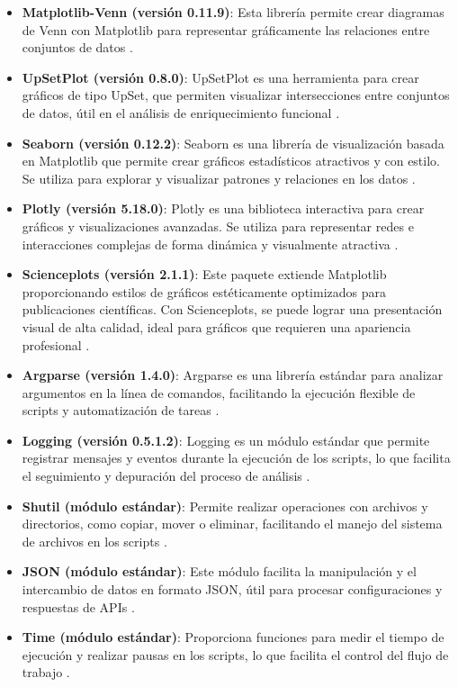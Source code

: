 \begin{itemize}
	\item \textbf{Matplotlib-Venn (versión 0.11.9)}: Esta librería permite crear diagramas de Venn con Matplotlib para representar gráficamente las relaciones entre conjuntos de datos \cite{matplotlibvenn}.
	\item \textbf{UpSetPlot (versión 0.8.0)}: UpSetPlot es una herramienta para crear gráficos de tipo UpSet, que permiten visualizar intersecciones entre conjuntos de datos, útil en el análisis de enriquecimiento funcional \cite{upsetplot}.
	\item \textbf{Seaborn (versión 0.12.2)}: Seaborn es una librería de visualización basada en Matplotlib que permite crear gráficos estadísticos atractivos y con estilo. Se utiliza para explorar y visualizar patrones y relaciones en los datos \cite{seaborn}.
	\item \textbf{Plotly (versión 5.18.0)}: Plotly es una biblioteca interactiva para crear gráficos y visualizaciones avanzadas. Se utiliza para representar redes e interacciones complejas de forma dinámica y visualmente atractiva \cite{plotly}.
	\item \textbf{Scienceplots (versión 2.1.1)}: Este paquete extiende Matplotlib proporcionando estilos de gráficos estéticamente optimizados para publicaciones científicas. Con Scienceplots, se puede lograr una presentación visual de alta calidad, ideal para gráficos que requieren una apariencia profesional \cite{scienceplots}.
	\item \textbf{Argparse (versión 1.4.0)}: Argparse es una librería estándar para analizar argumentos en la línea de comandos, facilitando la ejecución flexible de scripts y automatización de tareas \cite{argparse}.
	\item \textbf{Logging (versión 0.5.1.2)}: Logging es un módulo estándar que permite registrar mensajes y eventos durante la ejecución de los scripts, lo que facilita el seguimiento y depuración del proceso de análisis \cite{logging}.
	\item \textbf{Shutil (módulo estándar)}: Permite realizar operaciones con archivos y directorios, como copiar, mover o eliminar, facilitando el manejo del sistema de archivos en los scripts \cite{shutil}.
	\item \textbf{JSON (módulo estándar)}: Este módulo facilita la manipulación y el intercambio de datos en formato JSON, útil para procesar configuraciones y respuestas de APIs \cite{json}.
	\item \textbf{Time (módulo estándar)}: Proporciona funciones para medir el tiempo de ejecución y realizar pausas en los scripts, lo que facilita el control del flujo de trabajo \cite{time}.

\end{itemize}
